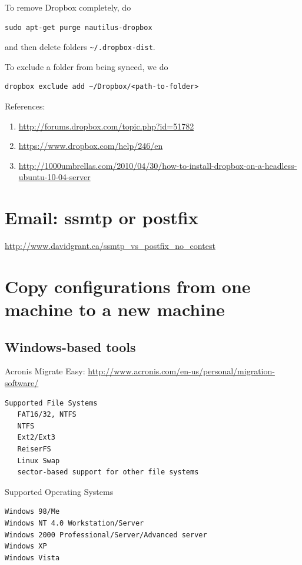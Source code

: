 To remove Dropbox completely, do
\begin{verbatim}
sudo apt-get purge nautilus-dropbox
\end{verbatim}
and then delete folders \verb!~/.dropbox-dist!. 


To exclude a folder from being synced, we do
\begin{verbatim}
dropbox exclude add ~/Dropbox/<path-to-folder>
\end{verbatim}
% 

References:
\begin{enumerate}
  \item \url{http://forums.dropbox.com/topic.php?id=51782}
  \item \url{https://www.dropbox.com/help/246/en}
  \item
  \url{http://1000umbrellas.com/2010/04/30/how-to-install-dropbox-on-a-headless-ubuntu-10-04-server}
\end{enumerate}


\section{Email: ssmtp or postfix}

\url{http://www.davidgrant.ca/ssmtp_vs_postfix_no_contest}

\section{Copy configurations from one machine to a new machine}


\subsection{Windows-based tools}

Acronis Migrate Easy:
\url{http://www.acronis.com/en-us/personal/migration-software/}
\begin{verbatim}
Supported File Systems
   FAT16/32, NTFS
   NTFS
   Ext2/Ext3
   ReiserFS
   Linux Swap
   sector-based support for other file systems
 \end{verbatim}
Supported Operating Systems
\begin{verbatim}
Windows 98/Me
Windows NT 4.0 Workstation/Server
Windows 2000 Professional/Server/Advanced server
Windows XP
Windows Vista
\end{verbatim}

